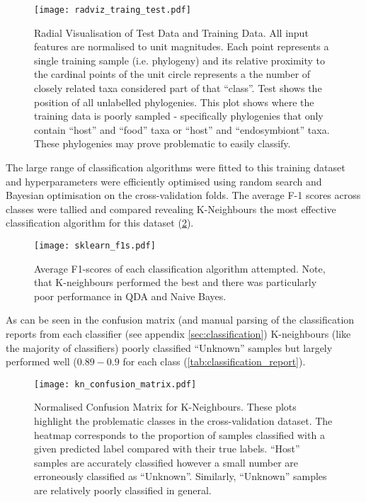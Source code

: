 \begin{figure}[h!]
		\centering
		\texttt{[image: radviz\_traing\_test.pdf]}
        \caption[Radial Visualisation of Test and Training Data]{Radial Visualisation of Test Data and Training Data. All input features are normalised to 
			unit magnitudes.  Each point represents a single training sample (i.e. phylogeny) and its relative proximity
			to the cardinal points of the unit circle represents a the number of closely related taxa considered part of
			that ``class''. 
			Test shows the position of all unlabelled phylogenies.  This plot shows where the training 
			data is poorly sampled - specifically phylogenies that only contain ``host'' and ``food'' taxa or
			``host'' and ``endosymbiont'' taxa.  These phylogenies may prove problematic to easily classify.}
		\label{fig:radvis_test}
\end{figure}


The large range of classification algorithms were fitted to this training dataset and
hyperparameters were efficiently optimised using random search and Bayesian optimisation on
the cross-validation folds. The average F-1 scores across classes were tallied and compared 
revealing K-Neighbours the most effective classification algorithm for this dataset (\cref{fig:f1_scores}).

\begin{figure}[h!]
	\centering
	\texttt{[image: sklearn\_f1s.pdf]}
    \caption[F1-scores of different classifiers]{Average F1-scores of each classification algorithm attempted.  Note, that K-neighbours performed
    the best and there was particularly poor performance in QDA and Naive Bayes.}
	\label{fig:f1_scores} 
\end{figure}


As can be seen in the confusion matrix (and manual parsing of the classification reports
from each classifier (see appendix \cref{sec:classification})
K-neighbours (like the majority of classifiers)
poorly classified ``Unknown'' samples but largely performed well (\(0.89-0.9\) for each class
(\cref{tab:classification_report}). 

\begin{figure}[h!]
	\centering
	\texttt{[image: kn\_confusion\_matrix.pdf]}
    \caption[Normalised confusion matrix of transcript classification]{Normalised Confusion Matrix for K-Neighbours.  These plots highlight
		the problematic classes in the cross-validation dataset. 
		 The heatmap corresponds to the proportion of samples classified
		 with a given predicted label compared with their true labels.
		``Host'' samples are accurately classified however a small number are erroneously
		classified as ``Unknown''.  Similarly, ``Unknown'' samples are relatively poorly
		classified in general.}
	\label{fig:confusion matrices} 
\end{figure}


